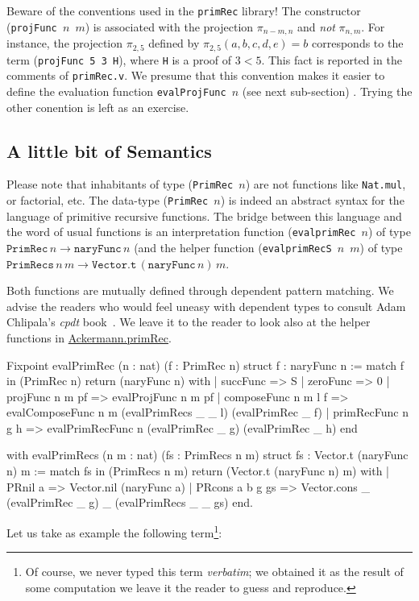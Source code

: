 \begin{remark}
\label{projFunc-order-of-args}
Beware of the conventions used in the \texttt{primRec} library!
The constructor (\texttt{projFunc $n$ $m$})  is associated with the projection $\pi_{n-m,n}$ and \emph{not}
$\pi_{n, m}$.
For instance, the projection $\pi_{2,5}$ defined by $\pi_{2,5}(a,b,c,d,e)=b$ corresponds to the term
(\texttt{projFunc 5 3 H}), where \texttt{H} is a proof of $3<5$.
 This fact is reported in the comments of \texttt{primRec.v}. We presume that this convention makes it easier to define the evaluation function \texttt{evalProjFunc $n$} (see next sub-section) . Trying the other conention is left as an exercise.
\end{remark}



\subsection{A little bit of Semantics} 
Please note that inhabitants of type (\texttt{PrimRec $n$}) are not \coq{} functions like \texttt{Nat.mul}, or factorial, etc. The data-type (\texttt{PrimRec $n$}) is indeed an abstract syntax for the language of primitive recursive functions. The bridge between this language and the word of usual functions
is an interpretation function (\texttt{evalprimRec $n$})  of type
$\texttt{PrimRec}\,n \rightarrow  \texttt{naryFunc}\,n$ (and the helper function 
(\texttt{evalprimRecS $n$ $m$}) of type 
$\texttt{PrimRecs}\,n\,m \rightarrow  \texttt{Vector.t}\,(\texttt{naryFunc}\,n)\,m$.


Both functions are mutually defined through dependent pattern matching. We advise the readers who 
would feel uneasy with dependent types to consult Adam Chlipala's \emph{cpdt}  book~\cite{chlipalacpdt2011}. We leave it to the reader  to look also at the helper functions in
\href{../theories/html/hydras.Ackermann.primRec.html}{Ackermann.primRec}.


\begin{Coqsrc}
Fixpoint evalPrimRec (n : nat) (f : PrimRec n) {struct f} : 
 naryFunc n :=
  match f in (PrimRec n) return (naryFunc n) with
  | succFunc => S
  | zeroFunc => 0
  | projFunc n m pf => evalProjFunc n m pf
  | composeFunc n m l f =>
      evalComposeFunc n m (evalPrimRecs _ _ l) (evalPrimRec _ f)
  | primRecFunc n g h =>
      evalPrimRecFunc n (evalPrimRec _ g) (evalPrimRec _ h)
  end
 
 with evalPrimRecs (n m : nat) (fs : PrimRecs n m) {struct fs} :
 Vector.t (naryFunc n) m :=
  match fs in (PrimRecs n m) return (Vector.t (naryFunc n) m) with
  | PRnil a => Vector.nil  (naryFunc a)
  | PRcons a b g gs =>
       Vector.cons _ (evalPrimRec _ g) _  (evalPrimRecs _ _ gs)
  end.
\end{Coqsrc}
Let us take as example the following term\footnote{Of course, we never typed this term \emph{verbatim}; we obtained it as the result of some computation we leave it the reader to guess and reproduce.}:

